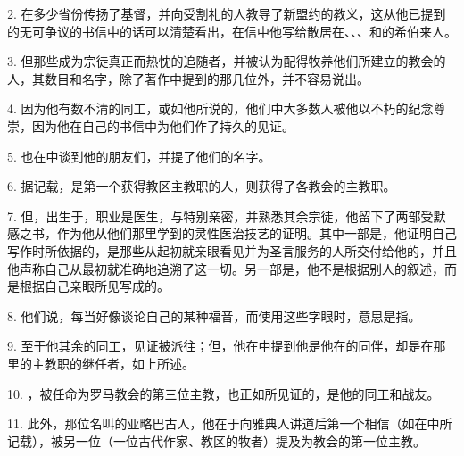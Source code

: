2. 在多少省份传扬了基督，并向受割礼的人教导了新盟约的教义，这从他已提到的无可争议的书信中的话可以清楚看出，在信中他写给散居在、、、和的希伯来人。\par

3. 但那些成为宗徒真正而热忱的追随者，并被认为配得牧养他们所建立的教会的人，其数目和名字，除了著作中提到的那几位外，并不容易说出。\par

4. 因为他有数不清的同工，或如他所说的，他们中大多数人被他以不朽的纪念尊崇，因为他在自己的书信中为他们作了持久的见证。\par

5. 也在中谈到他的朋友们，并提了他们的名字。\par

6. 据记载，是第一个获得教区主教职的人，则获得了各教会的主教职。\par

7. 但，出生于，职业是医生，与特别亲密，并熟悉其余宗徒，他留下了两部受默感之书，作为他从他们那里学到的灵性医治技艺的证明。其中一部是，他证明自己写作时所依据的，是那些从起初就亲眼看见并为圣言服务的人所交付给他的，并且他声称自己从最初就准确地追溯了这一切。另一部是，他不是根据别人的叙述，而是根据自己亲眼所见写成的。\par

8. 他们说，每当好像谈论自己的某种福音，而使用这些字眼时，意思是指。\par

9. 至于他其余的同工，见证被派往；但，他在中提到他是他在的同伴，却是在那里的主教职的继任者，如上所述。\par

10. ，被任命为罗马教会的第三位主教，也正如所见证的，是他的同工和战友。\par

11. 此外，那位名叫的亚略巴古人，他在于向雅典人讲道后第一个相信（如在中所记载），被另一位（一位古代作家、教区的牧者）提及为教会的第一位主教。\par

